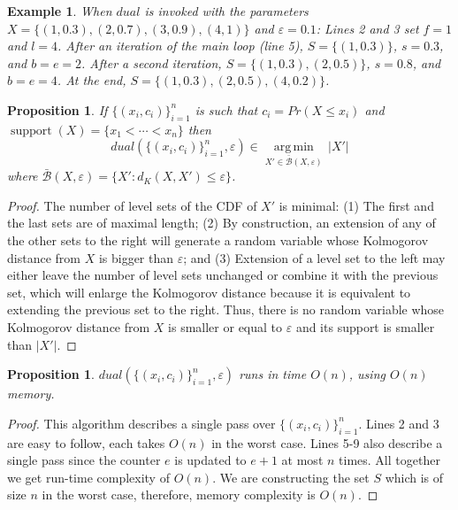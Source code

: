 \documentclass[letterpaper]{article} %
\newtheorem{example}[thm]{Example}
\newtheorem{proposition}[thm]{Proposition}
\DeclareMathOperator{\supp}{support}
\begin{document}

\begin{example}
\label{exmpl:dual}
When $dual$ is invoked with the parameters  $X{=}\{(1, 0.3), (2, 0.7), (3, 0.9), (4,1)\}$ and $\varepsilon{=}0.1$: Lines 2 and 3 set $f=1$ and $l=4$. After an iteration of the main loop (line 5), $S = \{(1,0.3)\}$, $s=0.3$, and $b=e=2$. After a second iteration, $S = \{(1,0.3), (2, 0.5)\}$, $s=0.8$, and $b=e=4$. At the end, $S = \{(1,0.3), (2, 0.5), (4, 0.2)\}$.
\end{example}

\begin{proposition}\label{the:correctnessDual}
	If  $\{(x_i, c_i)\}_{i=1}^n$ is such that $c_i=Pr(X \leq x_i)$ and $\supp(X)=\{x_1 < \cdots < x_n\}$ then  
    $$dual(\{(x_i, c_i)\}_{i=1}^n,\varepsilon) \in \underset{X'\in \bar{\mathcal{B}}(X,\varepsilon)}{\operatorname{arg\,min}}\, |X'|$$  where $\bar{\mathcal{B}}(X,\varepsilon)=\{X'\colon d_K(X,X')\leq \varepsilon\}$.
\end{proposition}
\begin{proof}
The number of level sets of the CDF of $X'$ is minimal: (1) The first and the last sets are of maximal length; (2) By construction, an extension of any of the other sets to the right will generate a random variable whose Kolmogorov distance from $X$ is bigger than $\varepsilon$; and (3) Extension of a level set to the left may either leave the number of level sets unchanged or combine it with the previous set, which will enlarge the Kolmogorov distance because it is equivalent to extending the previous set to the right. Thus, there is no random variable whose Kolmogorov distance from $X$ is smaller or equal to $\varepsilon$ and its support is smaller than $|X'|$.
\end{proof}



\begin{proposition}\label{the:complexityDual}
	$dual(\{(x_i, c_i)\}_{i=1}^n,\varepsilon)$ runs in time $O(n)$, using $O(n)$ memory.
\end{proposition}
\begin{proof}
This algorithm describes a single pass over $\{(x_i, c_i)\}_{i=1}^n$. Lines 2 and 3 are easy to follow, each takes $O(n)$ in the worst case. Lines 5-9 also describe a single pass since the counter $e$ is updated to $e+1$ at most $n$ times. All together we get run-time complexity of $O(n)$. We are constructing the set $S$ which is of size $n$ in the worst case, therefore, memory complexity is $O(n)$. 
\end{proof}
\end{document}
